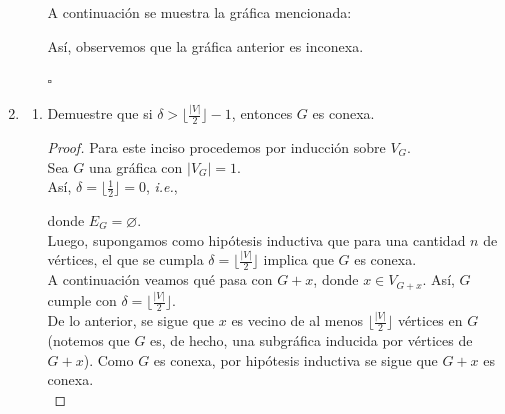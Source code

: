 \documentclass{article}
\begin{document}
\begin{enumerate}
\begin{enumerate}
      A continuación se muestra la gráfica mencionada:

      \begin{figure}[ht!]
        \centering
      \end{figure}

      Así, observemos que la gráfica anterior es inconexa.

      \hfill $\square$ \\
  \end{enumerate}

  \item \begin{enumerate}

    \item Demuestre que si $\delta > \lfloor \frac{|V|}{2} \rfloor - 1$,
      entonces $G$ es conexa.

      \renewcommand\qedsymbol{QED}
      \begin{proof}
        Para este inciso procedemos por inducción sobre $V_G$. \\
        Sea $G$ una gráfica con $|V_G| = 1$. \\
        Así, $\delta = \lfloor \frac{1}{2} \rfloor = 0$, \textit{i.e.},

        \begin{figure}[ht!]
          \centering
        \end{figure}

        donde $E_G = \varnothing$. \\
        Luego, supongamos como hipótesis inductiva que para una cantidad $n$ de
        vértices, el que se cumpla $\delta = \lfloor \frac{|V|}{2} \rfloor$ implica
        que $G$ es conexa. \\
        A continuación veamos qué pasa con $G + x$, donde $x \in V_{G +x}$.
        Así, $G$ cumple con $\delta = \lfloor \frac{|V|}{2} \rfloor$. \\
        De lo anterior, se sigue que $x$ es vecino de al menos $\lfloor \frac{|V|}{2}
        \rfloor$ vértices en $G$ (notemos que $G$ es, de hecho, una subgráfica inducida
        por vértices de $G +x$). Como $G$ es conexa, por hipótesis inductiva se sigue que $G +x$ es conexa. \\
      \end{proof}


\end{enumerate}
\end{enumerate}
\end{document}
